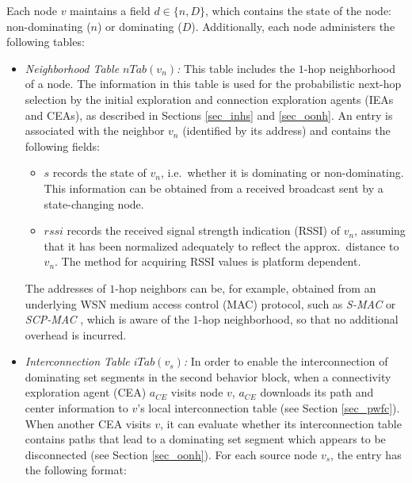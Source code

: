 Each node $v$ maintains a field $d\in \{n,D\}$, which contains the state of the node: non-dominating ($n$) or dominating ($D$). Additionally, each node administers the following tables:

\begin{itemize}

\item \emph{Neighborhood Table $nTab(v_n)$:} This table includes the $1$-hop neighborhood of a node. The information in this table is used for the probabilistic next-hop selection by the initial exploration and connection exploration agents (IEAs and CEAs), as described in Sections \ref{sec_inhs} and \ref{sec_oonh}. An entry is associated with the neighbor $v_n$ (identified by its address) and contains the following fields: 

		\begin{itemize}

			\item $s$ records the state of $v_n$, i.e.\ whether it is dominating or non-dominating. This information can be obtained from a received broadcast sent by a state-changing node.
			
			\item $rssi$ records the received signal strength indication (RSSI) of $v_n$, assuming that it has been normalized adequately to reflect the approx.\ distance to $v_n$. The method for acquiring RSSI values is platform dependent.
			
			\end{itemize}

The addresses of $1$-hop neighbors can be, for example, obtained from an underlying WSN medium access control (MAC) protocol, such as \emph{S-MAC} \cite{ye02protocol} or \emph{SCP-MAC} \cite{ye06mac}, which is aware of the $1$-hop neighborhood, so that no additional overhead is incurred.  

\item \emph{Interconnection Table $iTab(v_s)$:} In order to enable the interconnection of 
dominating set segments in the second behavior block, when a connectivity exploration agent (CEA) $a_{CE}$ visits node $v$, $a_{CE}$ downloads its path and center information to $v$'s local interconnection table (see Section \ref{sec_pwfc}). When another CEA visits $v$, it can evaluate whether its interconnection table contains paths that lead to a dominating set segment which appears to be disconnected (see Section \ref{sec_oonh}). For each source node $v_s$, the entry has the following format:


\end{itemize}

